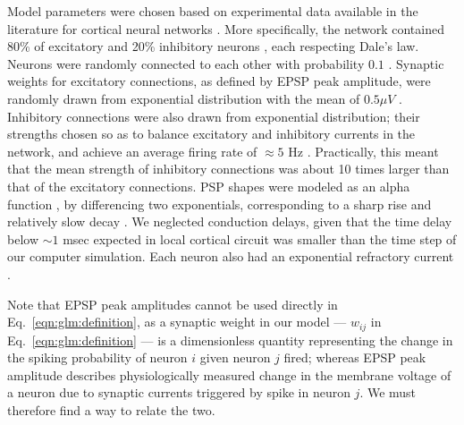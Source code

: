 \documentclass[aoas,preprint]{imsart}
\begin{document}
Model parameters were chosen based on experimental data available in the literature for cortical neural networks \cite{Braitenberg1998,Urquijo2000,Lefort2009,Sayer1990}. More specifically, the network contained 80\% of excitatory and 20\% inhibitory neurons \cite{Braitenberg1998,Urquijo2000}, each respecting Dale's law. Neurons were randomly connected to each other with probability $0.1$ \cite{Braitenberg1998,Lefort2009}. Synaptic weights for excitatory connections, as defined by EPSP peak amplitude, were randomly drawn from exponential distribution with the mean of $0.5 \mu V$ \cite{Lefort2009,Sayer1990}. Inhibitory connections were also drawn from exponential distribution; their strengths chosen so as to balance excitatory and inhibitory currents in the network, and achieve an average firing rate of $\approx 5 $ Hz \cite{Abeles91}. Practically, this meant that the mean strength of inhibitory connections was about 10 times larger than that of the excitatory connections. PSP shapes were modeled as an alpha function \cite{Koch99}, by differencing two exponentials, corresponding to a sharp rise and relatively slow decay \cite{Sayer1990}. We neglected conduction delays, given that the time delay below $\sim 1$ msec expected in local cortical circuit was smaller than the time step of our computer simulation. Each neuron also had an exponential refractory current \cite{Koch99}.

Note that EPSP peak amplitudes cannot be used directly in Eq.~\eqref{eqn:glm:definition}, as a synaptic weight in our model --- $w_{ij}$ in Eq.~\eqref{eqn:glm:definition} --- is a dimensionless quantity representing the change in the spiking probability of neuron $i$ given neuron $j$ fired; whereas EPSP peak amplitude describes physiologically measured change in the membrane voltage of a neuron due to synaptic currents triggered by spike in neuron $j$. We must therefore find a way to relate the two.
\end{document}
